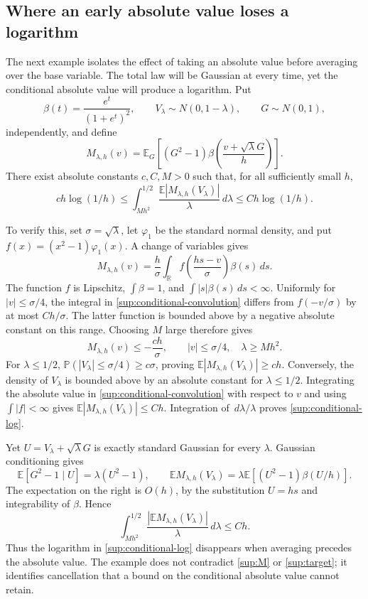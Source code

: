 \documentclass[11pt,a4paper]{article}
\theoremstyle{remark}
\newcommand{\E}{\mathbb E}
\newcommand{\Pp}{\mathbb P}
\newcommand{\R}{\mathbb R}
\newcommand{\dd}{\,d}
\begin{document}
\subsection{Where an early absolute value loses a logarithm}
\label{sup:conditional-example}

The next example isolates the effect of taking an absolute value
before averaging over the base variable. The total law will be
Gaussian at every time, yet the conditional absolute value will
produce a logarithm. Put
\[
 \beta(t)=\frac{e^t}{(1+e^t)^2},\qquad
 V_\lambda\sim N(0,1-\lambda),\qquad G\sim N(0,1),
\]
independently, and define
\[
 M_{\lambda,h}(v)=\E_G\left[(G^2-1)
       \beta\left(\frac{v+\sqrt\lambda G}{h}\right)\right].
\]
There exist absolute constants \(c,C,M>0\) such that, for all
sufficiently small \(h\),
\begin{equation}
 ch\log(1/h)
 \le\int_{Mh^2}^{1/2}
      \frac{\E|M_{\lambda,h}(V_\lambda)|}{\lambda}\dd\lambda
 \le Ch\log(1/h).
 \label{sup:conditional-log}
\end{equation}

To verify this, set \(\sigma=\sqrt\lambda\), let \(\varphi_1\)
be the standard normal density, and put
\(f(x)=(x^2-1)\varphi_1(x)\). A change of variables gives
\begin{equation}
 M_{\lambda,h}(v)
 =\frac h\sigma\int_\R
       f\left(\frac{hs-v}{\sigma}\right)\beta(s)\dd s.
 \label{sup:conditional-convolution}
\end{equation}
The function \(f\) is Lipschitz,
\(\int\beta=1\), and \(\int|s|\beta(s)\dd s<\infty\).
Uniformly for \(|v|\le\sigma/4\), the integral in
\eqref{sup:conditional-convolution} differs from \(f(-v/\sigma)\)
by at most \(Ch/\sigma\). The latter function is bounded above by
a negative absolute constant on this range. Choosing \(M\) large
therefore gives
\[
 M_{\lambda,h}(v)\le-\frac{ch}{\sigma},
 \qquad |v|\le\sigma/4,\quad \lambda\ge Mh^2.
\]
For \(\lambda\le1/2\),
\(\Pp(|V_\lambda|\le\sigma/4)\ge c\sigma\), proving
\(\E|M_{\lambda,h}(V_\lambda)|\ge ch\).
Conversely, the density of \(V_\lambda\) is bounded above by an
absolute constant for \(\lambda\le1/2\). Integrating the absolute
value in \eqref{sup:conditional-convolution} with respect to \(v\)
and using \(\int|f|<\infty\) gives
\(\E|M_{\lambda,h}(V_\lambda)|\le Ch\).
Integration of \(\dd\lambda/\lambda\) proves
\eqref{sup:conditional-log}.

Yet \(U=V_\lambda+\sqrt\lambda G\) is exactly standard Gaussian
for every \(\lambda\). Gaussian conditioning gives
\[
 \E[G^2-1\mid U]=\lambda(U^2-1),\qquad
 \E M_{\lambda,h}(V_\lambda)
 =\lambda\E[(U^2-1)\beta(U/h)].
\]
The expectation on the right is \(O(h)\), by the substitution
\(U=hs\) and integrability of \(\beta\). Hence
\begin{equation}
 \int_{Mh^2}^{1/2}
 \frac{|\E M_{\lambda,h}(V_\lambda)|}{\lambda}\dd\lambda
 \le Ch.
 \label{sup:signed-no-log}
\end{equation}
Thus the logarithm in \eqref{sup:conditional-log} disappears when
averaging precedes the absolute value. The example does not contradict
\eqref{sup:M} or \eqref{sup:target}; it identifies cancellation that a
bound on the conditional absolute value cannot retain.
\end{document}
